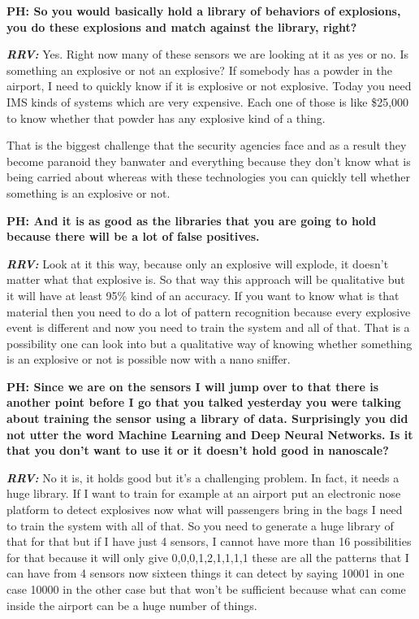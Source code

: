 \begin{multicols}{2}
\textbf{PH: So you would basically hold a library of behaviors of explosions, you do these explosions and match against the library, right?}

\vskip -0.1cm

\textbf{\textit{RRV:}} Yes. Right now many of these sensors we are looking at it as yes or no. Is something an explosive or not an explosive? If somebody has a powder in the airport, I need to quickly know if it is explosive or not explosive. Today you need IMS kinds of systems which are very expensive. Each one of those is like \$25,000 to know whether that powder has any explosive kind of a thing.

\vskip -0.1cm

That is the biggest challenge that the security agencies face and as a result they become paranoid they ban\break water and everything because they don’t know what is being carried about whereas with these technologies you can quickly tell whether something is an explosive or not.

\textbf{PH: And it is as good as the libraries that you are going to hold because there will be a lot of false positives.}

\textbf{\textit{RRV:}} Look at it this way, because only an explosive will explode, it doesn’t matter what that explosive is. So that way this approach will be qualitative but it will have at least 95\% kind of an accuracy. If you want to know what is that material then you need to do a lot of pattern recognition because every explosive event is different and now you need to train the system and all of that. That is a possibility one can look into but a qualitative way of knowing whether something is an explosive or not is possible now with a nano sniffer.

\textbf{PH: Since we are on the sensors I will jump over to that there is another point before I go that you talked yesterday you were talking about training the sensor using a library of data. Surprisingly you did not utter the word Machine Learning and Deep Neural Networks. Is it that you don’t want to use it or it doesn’t hold good in nanoscale? }

\textbf{\textit{RRV:}} No it is, it holds good but it’s a challenging problem. In fact, it needs a huge library. If I want to train for example at an airport put an electronic nose platform to detect explosives now what will passengers bring in the bags I need to train the system with all of that. So you need to generate a huge library of that for that but if I have just 4 sensors, I cannot have more than 16 possibilities for that because it will only give 0,0,0,1,2,1,1,1,1 these are all the patterns that I can have from 4 sensors now sixteen things it can detect by saying 10001 in one case 10000 in the other case but that won’t be sufficient because what can come inside the airport can be a huge number of things. 


\end{multicols}
